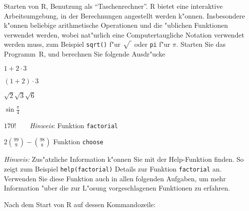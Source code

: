 Starten von R, Benutzung als ``Taschenrechner''.
R bietet eine interaktive Arbeitsumgebung, in der Berechnungen angestellt
werden k"onnen. Insbesondere k"onnen beliebige arithmetische Operationen
und die "ublichen Funktionen verwendet werden, wobei nat"urlich eine
Computertaugliche Notation verwendet werden muss, zum Beispiel
{\tt sqrt()} f"ur $\sqrt{\mathstrut\;}$ oder {\tt pi} f"ur $\pi$.
Starten Sie das Programm~R, und berechnen Sie folgende Ausdr"ucke
\begin{teilaufgaben}
\item $1+2\cdot 3$
\item $(1+2)\cdot 3$
\item $\sqrt{2}\sqrt{3}\sqrt{6}$
\item $\sin \frac{\pi}4$
\item $170!\qquad${\it Hinweis\/}: Funktion {\tt factorial}
\item $2\binom{99}{9}-\binom{98}{8}$  Funktion {\tt choose}
\end{teilaufgaben}
{\it Hinweis\/:} Zus"atzliche Information k"onnen Sie mit der Help-Funktion
finden. So zeigt zum Beispiel {\tt help(factorial)} Details zur Funktion
{\tt factorial} an. Verwenden Sie diese Funktion auch in allen folgenden
Aufgaben, um mehr Information "uber die zur L"osung vorgeschlagenen
Funktionen zu erfahren.

\begin{loesung}
Nach dem Start von R auf dessen Kommandozeile:
\end{loesung}


